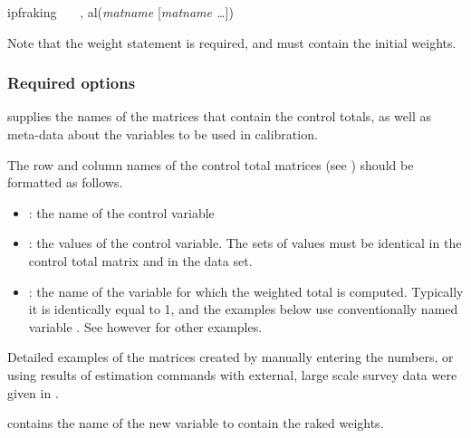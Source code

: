 \begin{stsyntax}
ipfraking
\optif\
\optin\
\optweight\
,
al({\it matname} [{\it matname \ldots}])
\end{stsyntax}

\hangpara
Note that the weight statement \stcmd{[pw=\varname]} is required, and must contain the initial weights.

\subsubsection{Required options}

\hangpara
{} \RB\stcmd{)}
supplies the names of the matrices that contain the control
totals, as well as meta-data about the variables to be used
in calibration.

\begin{sttech}
The row and column names of the control total matrices
(see ) should be formatted as follows.
\begin{itemize}
    \item \stcmd{rownames}: the name of the control variable
    \item \stcmd{colnames}: the values of the control variable. The sets of values
          must be identical in the control total matrix and in the data set.
    \item \stcmd{coleq}: the name of the variable for which the weighted total is computed.
          Typically it is identically equal to 1, and the examples below
          use conventionally named variable \stcmd{\_one}. See however
          \citet{kolenikov:hammer:2015} for other examples.
\end{itemize}

Detailed examples of the matrices created by manually entering the numbers,
or using results of estimation commands with external, large scale survey data
were given in \citet{kolenikov:2014}.

\end{sttech}

\hangpara
{}
contains the name of the new variable to contain the raked weights.

